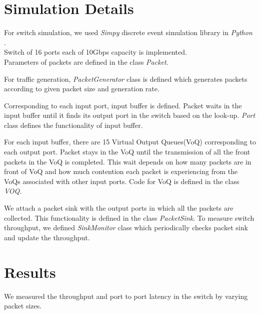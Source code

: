 \documentclass[twocolumn,10pt]{article}
\begin{document}
\section{Simulation Details}
For switch simulation, we used \textit{Simpy} discrete event simulation library in \textit{Python} .\\
Switch of 16 ports each of 10Gbps capacity is implemented.\\
Parameters of packets are defined in the class \textit{Packet}.

For traffic generation, \textit{PacketGenerator} class is defined which generates packets according to given packet size and generation rate.

Corresponding to each input port, input buffer is defined. Packet waits in the input buffer until it finds its output port in the switch based on the look-up.
\textit{Port} class defines the functionality of input buffer.

For each input buffer, there are 15 Virtual Output Queues(VoQ) corresponding to each output port.
Packet stays in the VoQ until the transmission of all the front packets in the VoQ is completed.
This wait depends on how many packets are in front of VoQ and how much contention each packet is experiencing from the VoQs associated with other input ports.
Code for VoQ is defined in the class \textit{VOQ}.

We attach a packet sink with the output ports in which all the packets are collected. This functionality is defined in the class \textit{PacketSink}.
To measure switch throughput, we defined \textit{SinkMonitor} class which periodically checks packet sink and update the throughput.

\section{Results}
We measured the throughput and port to port latency in the switch by varying packet sizes.
 
\end{document}
